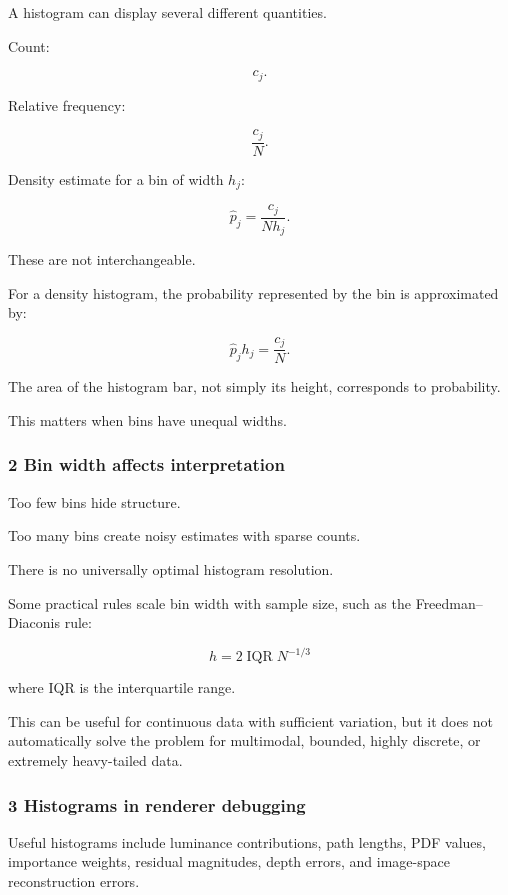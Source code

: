 A histogram can display several different quantities.

Count:

\[
 c_j.
\]

Relative frequency:

\[
 \frac{c_j}{N}.
\]

Density estimate for a bin of width \(h_j\):

\[
 \boxed{ \hat p_j= \frac{c_j}{Nh_j} }.
\]

These are not interchangeable.

For a density histogram, the probability represented by the bin is approximated by:

\[
 \hat p_jh_j=\frac{c_j}{N}.
\]

The area of the histogram bar, not simply its height, corresponds to probability.

This matters when bins have unequal widths.

\subsubsection{2 Bin width affects interpretation}\label{02-foundations-ii-ch030-bin-width-affects-interpretation}

Too few bins hide structure.

Too many bins create noisy estimates with sparse counts.

There is no universally optimal histogram resolution.

Some practical rules scale bin width with sample size, such as the Freedman--Diaconis rule:

\[
 \boxed{ h=2\operatorname{IQR}N^{-1/3} }
\]

where IQR is the interquartile range.

This can be useful for continuous data with sufficient variation, but it does not automatically solve the problem for multimodal, bounded, highly discrete, or extremely heavy-tailed data.

\subsubsection{3 Histograms in renderer debugging}\label{02-foundations-ii-ch030-histograms-in-renderer-debugging}

Useful histograms include luminance contributions, path lengths, PDF values, importance weights, residual magnitudes, depth errors, and image-space reconstruction errors.

